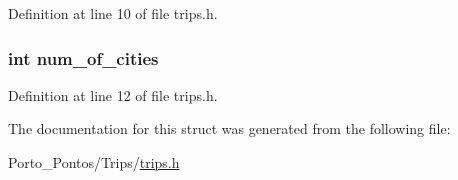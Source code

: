 Definition at line 10 of file trips.\+h.

\hypertarget{structcountry_abeadd002848341722eefd4a6a09e1e45}{}
\subsubsection[{num\+\_\+of\+\_\+cities}]{\setlength{\rightskip}{0pt plus 5cm}int num\+\_\+of\+\_\+cities}\label{structcountry_abeadd002848341722eefd4a6a09e1e45}


Definition at line 12 of file trips.\+h.



The documentation for this struct was generated from the following file\+:\begin{DoxyCompactItemize}
\item 
Porto\+\_\+\+Pontos/\+Trips/\hyperlink{trips_8h}{trips.\+h}\end{DoxyCompactItemize}
